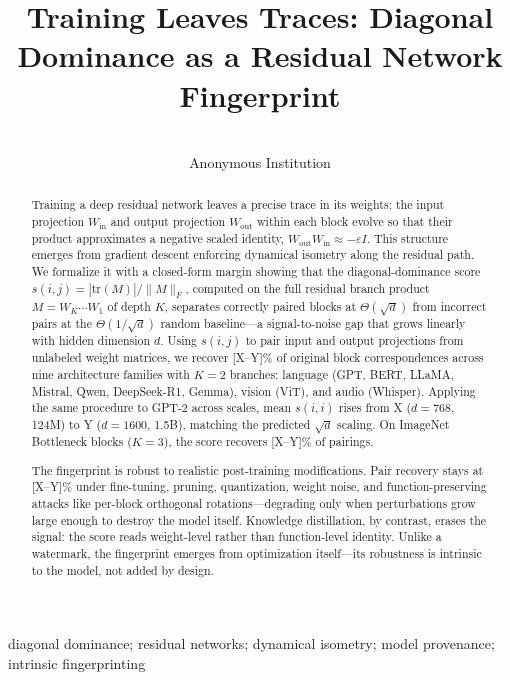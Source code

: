 \documentclass[wcp]{jmlr}
\title[Training Leaves Traces]{Training Leaves Traces: Diagonal Dominance as a Residual Network Fingerprint}
\author{\Name{Anonymous Authors}\\
\addr Anonymous Institution}
\begin{document}
\makeatletter
\let \@jmlrpages \@empty
\makeatother

\maketitle

\begin{abstract}
Training a deep residual network leaves a precise trace in its weights: the input projection $W_{\text{in}}$ and output projection $W_{\text{out}}$ within each block evolve so that their product approximates a negative scaled identity, $W_{\text{out}} W_{\text{in}} \approx -\varepsilon I$. This structure emerges from gradient descent enforcing dynamical isometry along the residual path. We formalize it with a closed-form margin showing that the diagonal-dominance score $s(i,j) = |\mathrm{tr}(M)| / \|M\|_F$, computed on the full residual branch product $M = W_K \cdots W_1$ of depth $K$, separates correctly paired blocks at $\Theta(\sqrt{d})$ from incorrect pairs at the $\Theta(1/\sqrt{d})$ random baseline---a signal-to-noise gap that grows linearly with hidden dimension $d$. Using $s(i,j)$ to pair input and output projections from unlabeled weight matrices, we recover {\color{red}[X--Y]}\% of original block correspondences across nine architecture families with $K=2$ branches: language (GPT, BERT, LLaMA, Mistral, Qwen, DeepSeek-R1, Gemma), vision (ViT), and audio (Whisper). Applying the same procedure to GPT-2 across scales, mean $s(i,i)$ rises from {\color{red}X} ($d=768$, 124M) to {\color{red}Y} ($d=1600$, 1.5B), matching the predicted $\sqrt{d}$ scaling. On ImageNet Bottleneck blocks ($K=3$), the score recovers {\color{red}[X--Y]}\% of pairings.

The fingerprint is robust to realistic post-training modifications. Pair recovery stays at {\color{red}[X--Y]}\% under fine-tuning, pruning, quantization, weight noise, and function-preserving attacks like per-block orthogonal rotations---degrading only when perturbations grow large enough to destroy the model itself. Knowledge distillation, by contrast, erases the signal: the score reads weight-level rather than function-level identity. Unlike a watermark, the fingerprint emerges from optimization itself—its robustness is intrinsic to the model, not added by design.
\end{abstract}
\begin{keywords}
diagonal dominance; residual networks; dynamical isometry; model provenance; intrinsic fingerprinting
\end{keywords}
\end{document}
